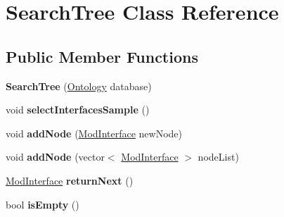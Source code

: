 \hypertarget{classSearchTree}{\section{\-Search\-Tree \-Class \-Reference}
\label{classSearchTree}
}
\subsection*{\-Public \-Member \-Functions}
\begin{DoxyCompactItemize}
\item 
\hypertarget{classSearchTree_ad03a994578c79b1cdd182be410db4ab0}{{\bfseries \-Search\-Tree} (\hyperlink{classOntology}{\-Ontology} database)}\label{classSearchTree_ad03a994578c79b1cdd182be410db4ab0}

\item 
\hypertarget{classSearchTree_a5a0b30848d7d170ad00cd886a34d8fe8}{void {\bfseries select\-Interfaces\-Sample} ()}\label{classSearchTree_a5a0b30848d7d170ad00cd886a34d8fe8}

\item 
\hypertarget{classSearchTree_a1f8b660125a47aa7d1af2830871ff05b}{void {\bfseries add\-Node} (\hyperlink{classModInterface}{\-Mod\-Interface} new\-Node)}\label{classSearchTree_a1f8b660125a47aa7d1af2830871ff05b}

\item 
\hypertarget{classSearchTree_a0cf14d6e1e2510b5193495e45171f1c0}{void {\bfseries add\-Node} (vector$<$ \hyperlink{classModInterface}{\-Mod\-Interface} $>$ node\-List)}\label{classSearchTree_a0cf14d6e1e2510b5193495e45171f1c0}

\item 
\hypertarget{classSearchTree_aa64084dc089000107dbcd85ffbb7f076}{\hyperlink{classModInterface}{\-Mod\-Interface} {\bfseries return\-Next} ()}\label{classSearchTree_aa64084dc089000107dbcd85ffbb7f076}

\item 
\hypertarget{classSearchTree_a51d11e157e80122ad329f4ec5cc10915}{bool {\bfseries is\-Empty} ()}\label{classSearchTree_a51d11e157e80122ad329f4ec5cc10915}

\end{DoxyCompactItemize}
